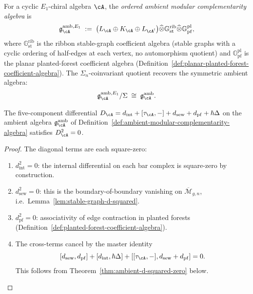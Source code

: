 \begin{definition}
\label{def:ordered-ambient-algebra}
\ClaimStatusProvedHere
{}
For a cyclic $E_1$-chiral algebra $\cA$, the \emph{ordered ambient
modular complementarity algebra} is
\begin{equation}
\label{eq:ordered-ambient-algebra}
\mathfrak{g}^{\mathrm{amb},E_1}_{\cA}
\;:=\;
\bigl(L_{\cA} \oplus K_{\cA} \oplus L_{\cA^!}\bigr)
\widehat\otimes \mathbb{G}_{\mathrm{st}}^{\mathrm{rib}}
\widehat\otimes \mathbb{G}_{\mathrm{pf}}^{\mathrm{pl}},
\end{equation}
where $\mathbb{G}_{\mathrm{st}}^{\mathrm{rib}}$ is the ribbon
stable-graph coefficient algebra \textup{(}stable graphs with a
cyclic ordering of half-edges at each vertex, no automorphism
quotient\textup{)} and
$\mathbb{G}_{\mathrm{pf}}^{\mathrm{pl}}$ is the planar
planted-forest coefficient algebra
\textup{(}Definition~\textup{\ref{def:planar-planted-forest-coefficient-algebra}}).
The $\Sigma_n$-coinvariant quotient recovers the symmetric ambient
algebra:
\[
\mathfrak{g}^{\mathrm{amb},E_1}_\cA / \Sigma
\;\cong\;
\mathfrak{g}^{\mathrm{amb}}_\cA.
\]
\end{definition}

\begin{proposition}
\label{prop:coefficient-algebras-well-defined}
The five-component differential
$D_{\cA} = d_{\mathrm{int}} + [\tau_{\cA},-] + d_{\mathrm{sew}} +
d_{\mathrm{pf}} + \hbar\Delta$
on the ambient algebra
$\mathfrak{g}^{\mathrm{amb}}_{\cA}$ of
Definition~\textup{\ref{def:ambient-modular-complementarity-algebra}}
satisfies $D_{\cA}^2 = 0$.
\end{proposition}

\begin{proof}
The diagonal terms are each square-zero:
\begin{enumerate}[label=\textup{(\roman*)}]
\item $d_{\mathrm{int}}^2 = 0$: the internal differential on each bar
  complex is square-zero by construction.
\item $d_{\mathrm{sew}}^2 = 0$: this is the boundary-of-boundary
  vanishing on $\overline{\mathcal{M}}_{g,n}$, i.e.\
  Lemma~\ref{lem:stable-graph-d-squared}.
\item $d_{\mathrm{pf}}^2 = 0$: associativity of edge contraction in
  planted forests
  (Definition~\ref{def:planted-forest-coefficient-algebra}).
\item The cross-terms cancel by the master identity
  \[
    [d_{\mathrm{sew}}, d_{\mathrm{pf}}]
    + [d_{\mathrm{int}}, \hbar\Delta]
    + [[\tau_{\cA},-], d_{\mathrm{sew}} + d_{\mathrm{pf}}]
    = 0.
  \]
  This follows from Theorem~\ref{thm:ambient-d-squared-zero} below.
\end{enumerate}
\end{proof}

